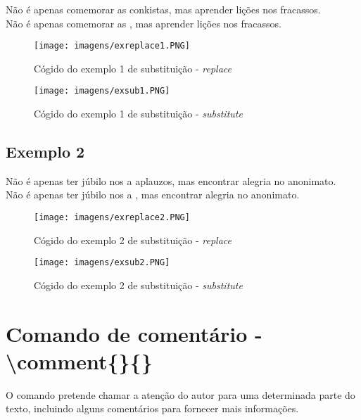 \documentclass[12pt,openright,oneside,a4paper,sumario=tradicional,brazil]{abntex2}
\begin{document}
\begin{center}
\justifying
Não é apenas comemorar as conkistas, mas aprender lições nos fracassos.\\

\noindent Não é apenas comemorar as , mas aprender lições nos fracassos.
\end{center}

\begin{figure}[htp]
\caption{Cógido do exemplo 1 de substituição - \textit{replace}}
        \centering
        \texttt{[image: imagens/exreplace1.PNG]}
\label{fig:replace1}
\end{figure}

\begin{figure}[htp]
\caption{Cógido do exemplo 1 de substituição - \textit{substitute}}
        \centering
        \texttt{[image: imagens/exsub1.PNG]}
\label{fig:sub1}
\end{figure}

\subsection{Exemplo 2}
\begin{center}
    \justifying
Não é apenas ter júbilo nos a aplauzos, mas encontrar alegria no anonimato.\\

\noindent Não é apenas ter júbilo nos a , mas encontrar alegria no anonimato.
    
\end{center}

\begin{figure}[htp]
\caption{Cógido do exemplo 2 de substituição - \textit{replace}}
        \centering
        \texttt{[image: imagens/exreplace2.PNG]}
\label{fig:replace2}
\end{figure}

\begin{figure}[htp]
\caption{Cógido do exemplo 2 de substituição - \textit{substitute}}
        \centering
        \texttt{[image: imagens/exsub2.PNG]}
\label{fig:sub2}
\end{figure}

\section{Comando de comentário - \textbackslash comment\{\}\{\}}
O comando pretende chamar a atenção do autor para uma determinada parte do texto, incluindo alguns comentários para fornecer mais informações.\\
\end{document}
